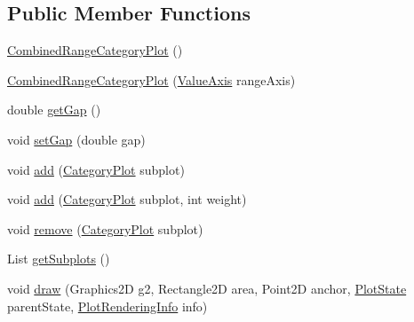 \subsection*{Public Member Functions}
\begin{DoxyCompactItemize}
\item 
\mbox{\hyperlink{classorg_1_1jfree_1_1chart_1_1plot_1_1_combined_range_category_plot_a5da9a67e859d2ebc91eec0330b419e5b}{Combined\+Range\+Category\+Plot}} ()
\item 
\mbox{\hyperlink{classorg_1_1jfree_1_1chart_1_1plot_1_1_combined_range_category_plot_ab2a23eae37c13505003a039f3d249e92}{Combined\+Range\+Category\+Plot}} (\mbox{\hyperlink{classorg_1_1jfree_1_1chart_1_1axis_1_1_value_axis}{Value\+Axis}} range\+Axis)
\item 
double \mbox{\hyperlink{classorg_1_1jfree_1_1chart_1_1plot_1_1_combined_range_category_plot_a5e987ea289d17c1e4a86ee61f178a53d}{get\+Gap}} ()
\item 
void \mbox{\hyperlink{classorg_1_1jfree_1_1chart_1_1plot_1_1_combined_range_category_plot_a98d6f3d49c6d55fb4f5244468cb81a7b}{set\+Gap}} (double gap)
\item 
void \mbox{\hyperlink{classorg_1_1jfree_1_1chart_1_1plot_1_1_combined_range_category_plot_a67615ef1c87fa10046f3fd2c9250f8e5}{add}} (\mbox{\hyperlink{classorg_1_1jfree_1_1chart_1_1plot_1_1_category_plot}{Category\+Plot}} subplot)
\item 
void \mbox{\hyperlink{classorg_1_1jfree_1_1chart_1_1plot_1_1_combined_range_category_plot_a9d51459838ef7a3d273f1dde1ece55c4}{add}} (\mbox{\hyperlink{classorg_1_1jfree_1_1chart_1_1plot_1_1_category_plot}{Category\+Plot}} subplot, int weight)
\item 
void \mbox{\hyperlink{classorg_1_1jfree_1_1chart_1_1plot_1_1_combined_range_category_plot_a31fb770a30155d658a599108651d63e7}{remove}} (\mbox{\hyperlink{classorg_1_1jfree_1_1chart_1_1plot_1_1_category_plot}{Category\+Plot}} subplot)
\item 
List \mbox{\hyperlink{classorg_1_1jfree_1_1chart_1_1plot_1_1_combined_range_category_plot_a00428ece2e080b390076ce205610887d}{get\+Subplots}} ()
\item 
void \mbox{\hyperlink{classorg_1_1jfree_1_1chart_1_1plot_1_1_combined_range_category_plot_aef3cb3830b0595ed10e862066ca7cf2d}{draw}} (Graphics2D g2, Rectangle2D area, Point2D anchor, \mbox{\hyperlink{classorg_1_1jfree_1_1chart_1_1plot_1_1_plot_state}{Plot\+State}} parent\+State, \mbox{\hyperlink{classorg_1_1jfree_1_1chart_1_1plot_1_1_plot_rendering_info}{Plot\+Rendering\+Info}} info)

\end{DoxyCompactItemize}
